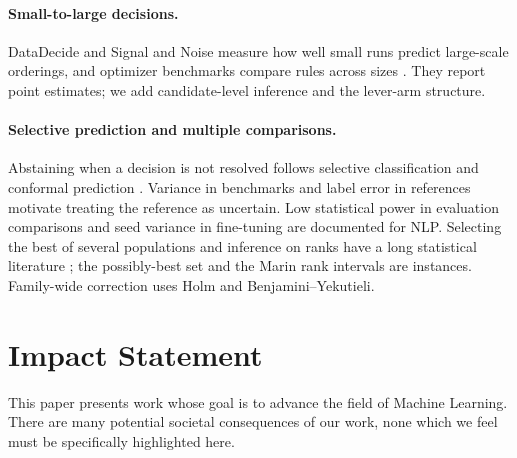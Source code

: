 \documentclass{article}
\begin{document}
\paragraph{Small-to-large decisions.} DataDecide \citep{magnusson2025datadecide}
and Signal and Noise \citep{heineman2025signal} measure how well small runs
predict large-scale orderings, and optimizer benchmarks compare rules across
sizes \citep{wen2025fantastic}. They report point estimates; we add
candidate-level inference and the lever-arm structure.

\paragraph{Selective prediction and multiple comparisons.} Abstaining when a
decision is not resolved follows selective classification
\citep{geifman2017selective} and conformal prediction
\citep{vovk2005algorithmic,angelopoulos2021gentle}. Variance in benchmarks
\citep{bouthillier2021accounting,madaan2024quantifying} and label error in
references \citep{northcutt2021pervasive} motivate treating the reference as
uncertain. Low statistical power in evaluation comparisons
\citep{card2020little,dror2018hitchhiker} and seed variance in fine-tuning
\citep{dodge2020fine} are documented for NLP. Selecting the best of several
populations and inference on ranks have a long statistical literature
\citep{gupta1965some,hsu1996multiple,mogstad2024inference}; the possibly-best
set and the Marin rank intervals are instances. Family-wide correction uses
Holm and Benjamini--Yekutieli.

\section*{Impact Statement}
This paper presents work whose goal is to advance the field of Machine
Learning. There are many potential societal consequences of our work, none
which we feel must be specifically highlighted here.




\newpage
\appendix
\onecolumn

\end{document}
